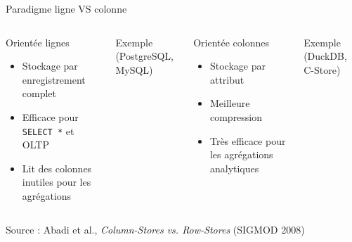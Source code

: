 \documentclass[a4paper,12pt]{beamer}
\begin{document}
\begin{frame}{Paradigme ligne VS colonne}
    \begin{columns}[T]
        \begin{block}{Orientée lignes}
            \footnotesize
            \begin{itemize}
                \item Stockage par enregistrement complet
                \item Efficace pour \texttt{SELECT *} et OLTP
                \item Lit des colonnes inutiles pour les agrégations
            \end{itemize}
        \end{block}
        \vspace{0.2cm}
        \begin{exampleblock}{Exemple (PostgreSQL, MySQL)}
            \centering\scriptsize
        \end{exampleblock}

        \begin{block}{Orientée colonnes}
            \footnotesize
            \begin{itemize}
                \item Stockage par attribut
                \item Meilleure compression
                \item Très efficace pour les agrégations analytiques
            \end{itemize}
        \end{block}
        \vspace{0.2cm}
        \begin{exampleblock}{Exemple (DuckDB, C-Store)}
            \centering\scriptsize
        \end{exampleblock}
    \end{columns}
    \vfill
    {\tiny Source : Abadi et al., \textit{Column-Stores vs. Row-Stores} (SIGMOD 2008)}
\end{frame}
\end{document}
